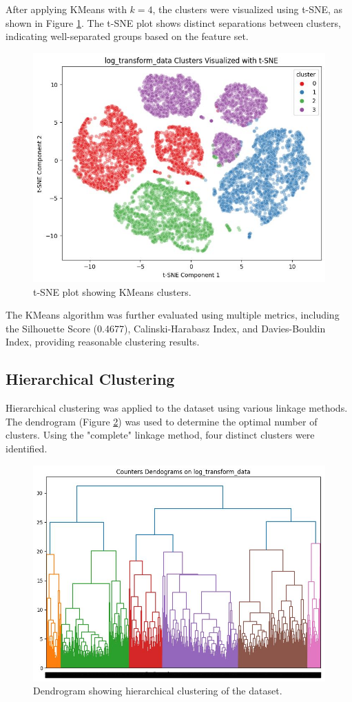 \documentclass[runningheads,a4paper]{llncs}
\begin{document}
After applying KMeans with \(k=4\), the clusters were visualized using t-SNE, as shown in Figure \ref{fig:kmeans_tsne}. The t-SNE plot shows distinct separations between clusters, indicating well-separated groups based on the feature set.

\begin{figure}[h]
    \centering
    \includegraphics[width=0.4\linewidth]{kmeans-tsne.jpeg} %
    \caption{t-SNE plot showing KMeans clusters.}
    \label{fig:kmeans_tsne}
\end{figure}

The KMeans algorithm was further evaluated using multiple metrics, including the Silhouette Score (0.4677), Calinski-Harabasz Index, and Davies-Bouldin Index, providing reasonable clustering results.

\subsection{Hierarchical Clustering}

Hierarchical clustering was applied to the dataset using various linkage methods. The dendrogram (Figure \ref{fig:dendrogram}) was used to determine the optimal number of clusters. Using the "complete" linkage method, four distinct clusters were identified.

\begin{figure}[h]
    \centering
    \includegraphics[width=0.4\linewidth]{dendogram.jpeg} %
    \caption{Dendrogram showing hierarchical clustering of the dataset.}
    \label{fig:dendrogram}
\end{figure}
\end{document}
